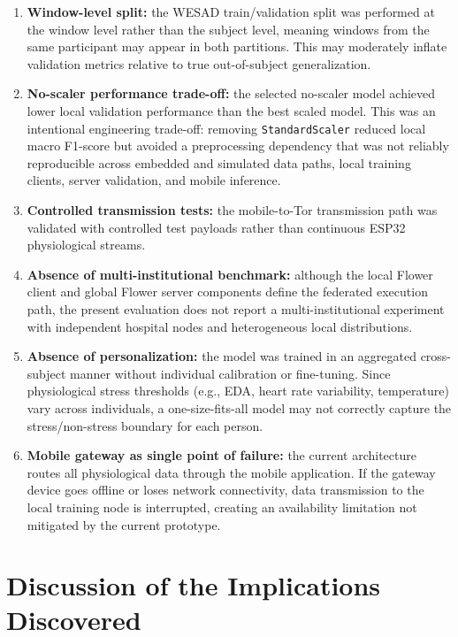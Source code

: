 \documentclass[12pt]{article}
\begin{document}
\begin{enumerate}[leftmargin=*]
\item \textbf{Window-level split:} the WESAD train/validation split was performed at the window level rather than the subject level, meaning windows from the same participant may appear in both partitions. This may moderately inflate validation metrics relative to true out-of-subject generalization.

\item \textbf{No-scaler performance trade-off:} the selected no-scaler model achieved lower local validation performance than the best scaled model. This was an intentional engineering trade-off: removing \texttt{StandardScaler} reduced local macro F1-score but avoided a preprocessing dependency that was not reliably reproducible across embedded and simulated data paths, local training clients, server validation, and mobile inference.

\item \textbf{Controlled transmission tests:} the mobile-to-Tor transmission path was validated with controlled test payloads rather than continuous ESP32 physiological streams.

\item \textbf{Absence of multi-institutional benchmark:} although the local Flower client and global Flower server components define the federated execution path, the present evaluation does not report a multi-institutional experiment with independent hospital nodes and heterogeneous local distributions.

\item \textbf{Absence of personalization:} the model was trained in an aggregated cross-subject manner without individual calibration or fine-tuning. Since physiological stress thresholds (e.g., EDA, heart rate variability, temperature) vary across individuals, a one-size-fits-all model may not correctly capture the stress/non-stress boundary for each person.

\item \textbf{Mobile gateway as single point of failure:} the current architecture routes all physiological data through the mobile application. If the gateway device goes offline or loses network connectivity, data transmission to the local training node is interrupted, creating an availability limitation not mitigated by the current prototype.

\end{enumerate}

\section{Discussion of the Implications Discovered}
\end{document}
